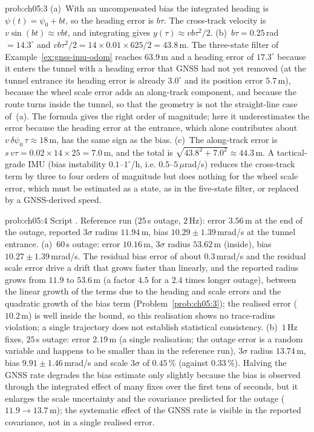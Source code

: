 \begin{sol}{prob:ch05:3}
(a)~With an uncompensated bias the integrated heading is $\psi(t)=\psi_{0}+bt$, so the heading error is $b\tau$. The cross-track velocity is $v\sin(bt)\approx vbt$, and integrating gives $y(\tau)\approx vb\tau^{2}/2$. (b)~$b\tau=0.25$\,rad $=14.3^{\circ}$ and $vb\tau^{2}/2=14\times0.01\times625/2=43.8$\,m. The three-state filter of Example~\ref{ex:gnss-imu-odom} reaches $63.9$\,m and a heading error of $17.3^{\circ}$ because it enters the tunnel with a heading error that GNSS had not yet removed (at the tunnel entrance its heading error is already $3.0^{\circ}$ and its position error $5.7$\,m), because the wheel scale error adds an along-track component, and because the route turns inside the tunnel, so that the geometry is not the straight-line case of~(a). The formula gives the right order of magnitude; here it underestimates the error because the heading error at the entrance, which alone contributes about $v\,\delta\psi_{0}\,\tau\approx18$\,m, has the same sign as the bias. (c)~The along-track error is $s\,v\tau=0.02\times14\times25=7.0$\,m, and the total is $\sqrt{43.8^{2}+7.0^{2}}\approx44.3$\,m. A tactical-grade IMU (bias instability $0.1$--$1^{\circ}$/h, i.e. $0.5$--$5\,\mu$rad/s) reduces the cross-track term by three to four orders of magnitude but does nothing for the wheel scale error, which must be estimated as a state, as in the five-state filter, or replaced by a GNSS-derived speed.
\end{sol}

\begin{sol}{prob:ch05:4}
Script . Reference run ($25$\,s outage, $2$\,Hz): error $3.56$\,m at the end of the outage, reported $3\sigma$ radius $11.94$\,m, bias $10.29\pm1.39$\,mrad/s at the tunnel entrance. (a)~$60$\,s outage: error $10.16$\,m, $3\sigma$ radius $53.62$\,m (inside), bias $10.27\pm1.39$\,mrad/s. The residual bias error of about $0.3$\,mrad/s and the residual scale error drive a drift that grows faster than linearly, and the reported radius grows from $11.9$ to $53.6$\,m (a factor $4.5$ for a $2.4$ times longer outage), between the linear growth of the terms due to the heading and scale errors and the quadratic growth of the bias term (Problem~\ref{prob:ch05:3}); the realised error ($10.2$\,m) is well inside the bound, so this realisation shows no trace-radius violation; a single trajectory does not establish statistical consistency. (b)~$1$\,Hz fixes, $25$\,s outage: error $2.19$\,m (a single realisation; the outage error is a random variable and happens to be smaller than in the reference run), $3\sigma$ radius $13.74$\,m, bias $9.91\pm1.46$\,mrad/s and scale $3\sigma$ of $0.45$\,\% (against $0.33$\,\%). Halving the GNSS rate degrades the bias estimate only slightly because the bias is observed through the integrated effect of many fixes over the first tens of seconds, but it enlarges the scale uncertainty and the covariance predicted for the outage ($11.9\to13.7$\,m); the systematic effect of the GNSS rate is visible in the reported covariance, not in a single realised error.
\end{sol}

